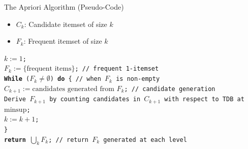 \documentclass[aspectratio=169, 11pt]{beamer}
\begin{document}
\begin{frame}{The Apriori Algorithm (Pseudo-Code)}
    \begin{itemize}
        \item $C_k$: Candidate itemset of size $k$
        \item $F_k$: Frequent itemset of size $k$
    \end{itemize}
    \vspace{2mm}
    \begin{tcolorbox}[colback=LightGray, colframe=black!30, title=\textbf{Apriori Algorithm}]
        \footnotesize
        \texttt{$k := 1$;}\\
        \texttt{$F_k := \{\text{frequent items}\}$; \hfill // frequent 1-itemset}\\
        \texttt{\textbf{While} ($F_k \neq \emptyset$) \textbf{do} \{ \hfill // when $F_k$ is non-empty}\\
        \texttt{\hspace*{6mm}$C_{k+1} := \text{candidates generated from } F_k$; \hfill // candidate generation}\\
        \texttt{\hspace*{6mm}Derive $F_{k+1}$ by counting candidates in $C_{k+1}$ with respect to TDB at $\text{minsup}$;}\\
        \texttt{\hspace*{6mm}$k := k + 1$;}\\
        \texttt{\}}\\
        \texttt{\textbf{return} $\bigcup_k F_k$; \hfill // return $F_k$ generated at each level}
    \end{tcolorbox}
\end{frame}
\end{document}
